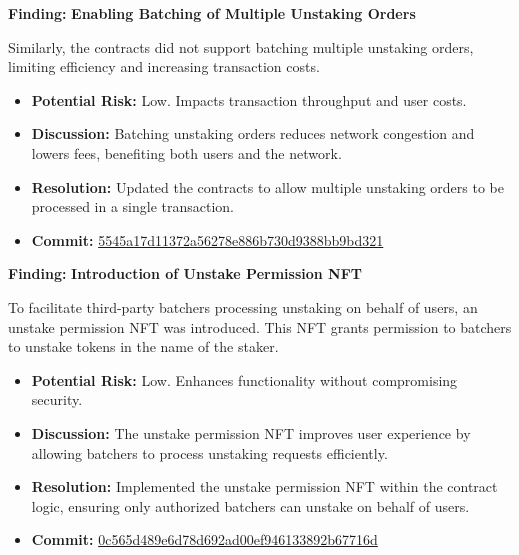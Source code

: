 \documentclass{article}
\begin{document}
\begin{minorbox}
\textbf{Finding:} \textbf{Enabling Batching of Multiple Unstaking Orders}

Similarly, the contracts did not support batching multiple unstaking orders, limiting efficiency and increasing transaction costs.

\begin{itemize}[label=$\diamond$]
    \item \textbf{Potential Risk:} Low. Impacts transaction throughput and user costs.
    \item \textbf{Discussion:} Batching unstaking orders reduces network congestion and lowers fees, benefiting both users and the network.
    \item \textbf{Resolution:} Updated the contracts to allow multiple unstaking orders to be processed in a single transaction.
    \item \textbf{Commit:} \href{https://github.com/MuesliSwapTeam/muesliswap-decentralized-farming/commit/5545a17d11372a56278e886b730d9388bb9bd321}{5545a17d11372a56278e886b730d9388bb9bd321}
\end{itemize}
\end{minorbox}

\begin{minorbox}
\textbf{Finding:} \textbf{Introduction of Unstake Permission NFT}

To facilitate third-party batchers processing unstaking on behalf of users, an unstake permission NFT was introduced. This NFT grants permission to batchers to unstake tokens in the name of the staker.

\begin{itemize}[label=$\diamond$]
    \item \textbf{Potential Risk:} Low. Enhances functionality without compromising security.
    \item \textbf{Discussion:} The unstake permission NFT improves user experience by allowing batchers to process unstaking requests efficiently.
    \item \textbf{Resolution:} Implemented the unstake permission NFT within the contract logic, ensuring only authorized batchers can unstake on behalf of users.
    \item \textbf{Commit:} \href{https://github.com/MuesliSwapTeam/muesliswap-decentralized-farming/commit/0c565d489e6d78d692ad00ef946133892b67716d}{0c565d489e6d78d692ad00ef946133892b67716d}
\end{itemize}
\end{minorbox}
\end{document}
